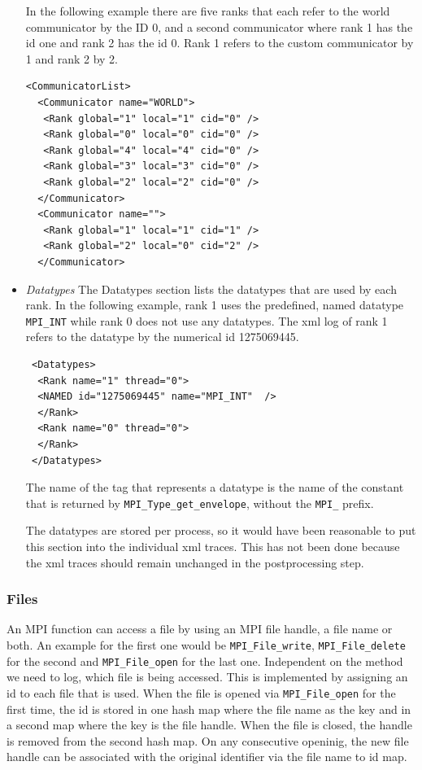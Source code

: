 \documentclass[a4paper,12pt,pdftex]{scrartcl}
\begin{document}
\begin{itemize}
  In the following example there are five ranks that each refer to the
  world communicator by the ID 0, and a second communicator where rank
  1 has the id one and rank 2 has the id 0. Rank 1 refers to the
  custom communicator by 1 and rank 2 by 2.
\begin{lstlisting}
<CommunicatorList>
  <Communicator name="WORLD">
   <Rank global="1" local="1" cid="0" />
   <Rank global="0" local="0" cid="0" />
   <Rank global="4" local="4" cid="0" />
   <Rank global="3" local="3" cid="0" />
   <Rank global="2" local="2" cid="0" />
  </Communicator>
  <Communicator name="">
   <Rank global="1" local="1" cid="1" />
   <Rank global="2" local="0" cid="2" />
  </Communicator>
\end{lstlisting}
\item \emph{Datatypes} The Datatypes section lists the datatypes that
  are used by each rank. In the following example, rank 1 uses the
  predefined, named datatype \verb/MPI_INT/ while rank 0 does not use
  any datatypes. The xml log of rank 1 refers to the datatype by the
  numerical id 1275069445.
\begin{lstlisting}
 <Datatypes>
  <Rank name="1" thread="0">
  <NAMED id="1275069445" name="MPI_INT"  />
  </Rank>
  <Rank name="0" thread="0">
  </Rank>
 </Datatypes>
\end{lstlisting}
  The name of the tag that represents a datatype is the name of the
  constant that is returned by \verb/MPI_Type_get_envelope/, without
  the \verb/MPI_/ prefix.

  The datatypes are stored per process, so it would have been
  reasonable to put this section into the individual xml traces. This
  has not been done because the xml traces should remain unchanged in
  the postprocessing step.
\end{itemize}

\subsubsection{Files}
An MPI function can access a file by using an MPI file handle, a file
name or both. An example for the first one would be
\verb/MPI_File_write/, \verb/MPI_File_delete/ for the second and
\verb/MPI_File_open/ for the last one.  Independent on the method we
need to log, which file is being accessed.  This is implemented by
assigning an id to each file that is used. When the file is opened via
\verb/MPI_File_open/ for the first time, the id is stored in one hash
map where the file name as the key and in a second map where the key
is the file handle. When the file is closed, the handle is removed
from the second hash map. On any consecutive openinig, the new file
handle can be associated with the original identifier via the file
name to id map.
\end{document}
